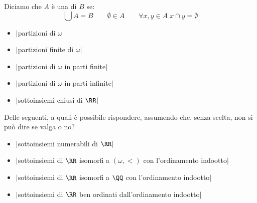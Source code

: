 \documentclass[11pt]{scrartcl}
\begin{document}
\begin{definition}[Partizione]
	Diciamo che $A$ è una  di $B$ se:
	\[ \bigcup A = B \qquad \emptyset \in A \qquad \forall x,y \in A \; x \cap y = \emptyset
		\]
\end{definition}

\begin{itemize}
	\item $|$partizioni di $\omega|$
\end{itemize}

\begin{itemize}
	\item $|$partizioni finite di $\omega|$
\end{itemize}

\begin{itemize}
	\item $|$partizioni di $\omega$ in parti finite$|$
\end{itemize}

\begin{itemize}
	\item $|$partizioni di $\omega$ in parti infinite$|$
\end{itemize}

\begin{itemize}
	\item $|$sottoinsiemi chiusi di $\RR|$
\end{itemize}

\begin{exercise}
	Delle seguenti, a quali è possibile rispondere, assumendo che, senza scelta, non si può dire se valga o no?
\end{exercise}

\begin{itemize}
	\item $|$sottoinsiemi numerabili di $\RR|$
\end{itemize}

\begin{itemize}
	\item $|$sottoinsiemi di $\RR$ isomorfi a $(\omega,<)$ con l'ordinamento indootto$|$
\end{itemize}

\begin{itemize}
	\item $|$sottoinsiemi di $\RR$ isomorfi a $\QQ$ con l'ordinamento indootto$|$
\end{itemize}

\begin{itemize}
	\item $|$sottoinsiemi di $\RR$ ben ordinati dall'ordinamento indootto$|$
\end{itemize}
\end{document}
